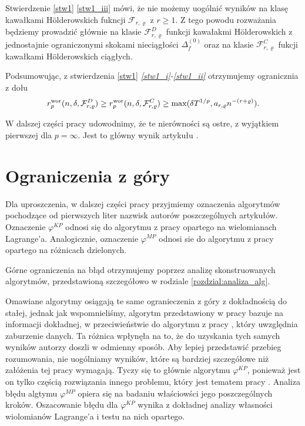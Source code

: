 \documentclass[oik, pdftex, robocza, man]{mgrwms}
\begin{document}
    Stwierdzenie \ref{stw1} \ref{stw1_iii} mówi, że nie możemy uogólnić wyników na klasę kawałkami Hölderowskich fukncji $\mathcal{F}_{r,\varrho}$ z $r \geq 1$. Z tego powodu rozważania będziemy prowadzić głównie na klasie $\mathcal{F}_{r,\varrho}^{D}$ funkcji kawałakmi Hölderowskich z jednostajnie ograniczonymi skokami nieciągłości $\Delta_{f}^{(0)}$ oraz na klasie $\mathcal{F}_{r,\varrho}^{C}$ fukcji kawałkami Hölderowskich ciągłych.

    Podsumowując, z stwierdzenia \ref{stw1} \textit{\ref{stw1_i}-\ref{stw1_ii}} otrzymujemy ogranicznia z dołu
    \begin{equation*}
        r^{\mathrm{wor}}_{p}(n, \delta, \mathcal{F}^{D}_{r,\varrho}) \geq r^{\mathrm{wor}}_{p}(n, \delta, \mathcal{F}^{C}_{r,\varrho}) \geq \max(\delta T^{1/p}, a_{r,\varrho} n^{-(r+\varrho)}).
    \end{equation*}

    W dalszej części pracy udowodnimy, że te nierówności są ostre, z wyjątkiem pierwszej dla $p=\infty$. Jest to główny wynik artykułu \cite{AoP}.


\section{Ograniczenia z góry}


    Dla uproszczenia, w dalszej części pracy przyjmiemy oznaczenia algorytmów pochodzące od pierwszych liter nazwisk autorów poszczególnych artykułów. Oznaczenie $\varphi^{KP}$ odnosi się do algorytmu z pracy \cite{CoDF} opartego na wielomianach Lagrange'a. Analogicznie, oznaczenie $\varphi^{MP}$ odnosi sie do algorytmu z pracy \cite{AoP} opartego na różnicach dzielonych.

    Górne ograniczenia na błąd otrzymujemy poprzez analizę skonstruowanych algorytmów, przedstawioną szczegółowo w rodziale \ref{rozdzial:analiza_alg}.
    
    Omawiane algorytmy osiągają te same ogranieczenia z góry z dokładnością do stałej, jednak jak wspomnieliśmy, algorytm przedstawiony w pracy \cite{CoDF} bazuje na informacji dokładnej, w przeciwieństwie do algorytmu z pracy \cite{AoP}, który uwzględnia zaburzenie danych. Ta różnica wpłynęła na to, że do uzyskania tych samych wyników autorzy doszli w odmienny sposób. Aby lepiej przedstawić przebieg rozumowania, nie uogólniamy wyników, które są bardziej szczegółowe niż załóżenia tej pracy wymagają. Tyczy się to głównie algorytmu $\varphi^{KP}$, ponieważ jest on tylko częścią rozwiązania innego problemu, który jest tematem pracy \cite{CoDF}. Analiza błędu algtymu $\varphi^{MP}$ opiera się na badaniu właściowści jego poszczególnych kroków. Oszacowanie błędu dla $\varphi^{KP}$ wynika z dokładnej analizy własności wiolomianów Lagrange'a i testu na nich opartego.
\end{document}
